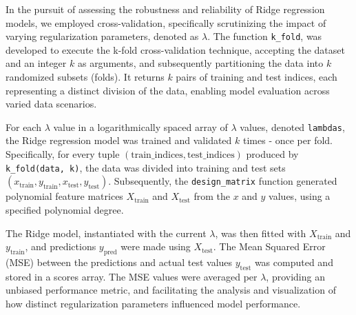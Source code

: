 In the pursuit of assessing the robustness and reliability of Ridge regression models, we employed cross-validation, specifically scrutinizing the impact of varying regularization parameters, denoted as \(\lambda\). The function \texttt{k\_fold}, was developed to execute the k-fold cross-validation technique, accepting the dataset and an integer \(k\) as arguments, and subsequently partitioning the data into \(k\) randomized subsets (folds). It returns \(k\) pairs of training and test indices, each representing a distinct division of the data, enabling model evaluation across varied data scenarios.

For each \(\lambda\) value in a logarithmically spaced array of \(\lambda\) values, denoted \texttt{lambdas}, the Ridge regression model was trained and validated \(k\) times - once per fold. Specifically, for every tuple \((\text{train\_indices}, \text{test\_indices})\) produced by \texttt{k\_fold(data, k)}, the data was divided into training and test sets \((x_{\text{train}}, y_{\text{train}}, x_{\text{test}}, y_{\text{test}})\).
Subsequently, the \texttt{design\_matrix} function generated polynomial feature matrices \(X_{\text{train}}\) and \(X_{\text{test}}\) from the \(x\) and \(y\) values, using a specified polynomial degree. 

The Ridge model, instantiated with the current \(\lambda\), was then fitted with \(X_{\text{train}}\) and \(y_{\text{train}}\), and predictions \(y_{\text{pred}}\) were made using \(X_{\text{test}}\). The Mean Squared Error (MSE) between the predictions and actual test values \(y_{\text{test}}\) was computed and stored in a scores array.
The MSE values were averaged per \(\lambda\), providing an unbiased performance metric, and facilitating the analysis and visualization of how distinct regularization parameters influenced model performance.
